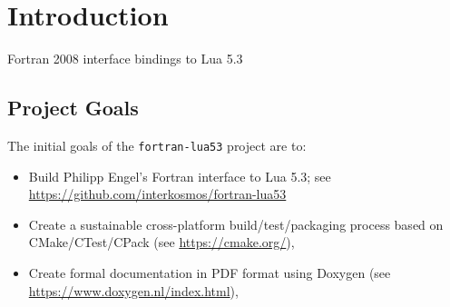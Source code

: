 \chapter{Introduction}

Fortran 2008 interface bindings to Lua 5.3

\section{Project Goals}

The initial goals of the \texttt{fortran-lua53} project are to:

\begin{itemize}
    \item Build Philipp Engel's Fortran interface to Lua 5.3; see \url{https://github.com/interkosmos/fortran-lua53}
    \item Create a sustainable cross-platform build/test/packaging
          process based on CMake/CTest/CPack (see \url{https://cmake.org/}),
    \item Create formal documentation in PDF format using Doxygen (see \url{https://www.doxygen.nl/index.html}),
\end{itemize}

